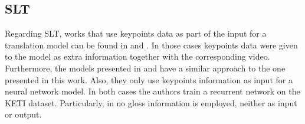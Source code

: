 \subsection{SLT}

Regarding SLT, works that use keypoints data as part of the input for a translation model can be found in \cite{borg2020phonologically} and  \cite{zhou2020spatial}. In those cases keypoints data were given to the model as extra information together with the corresponding video. Furthermore, the models presented in \cite{ko2019neural} and \cite{kim2022keypoint} have a similar approach to the one presented in this work. Also, they only use keypoints information as input for a neural network model. In both cases the authors train a recurrent network on the KETI dataset. Particularly, in \cite{kim2022keypoint} no gloss information is employed, neither as input or output.
